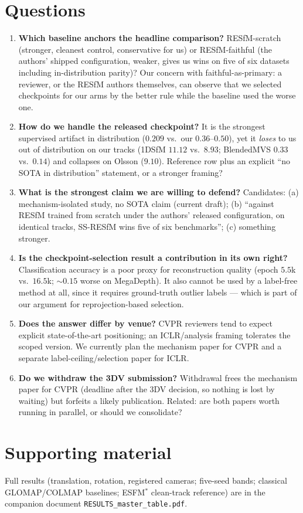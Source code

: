 \documentclass[11pt,letterpaper]{article}
\begin{document}
\section*{Questions}
\begin{enumerate}[leftmargin=*,itemsep=6pt]
\item \textbf{Which baseline anchors the headline comparison?} RESfM-scratch (stronger, cleanest
control, conservative for us) or RESfM-faithful (the authors' shipped configuration, weaker, gives
us wins on five of six datasets including in-distribution parity)? Our concern with faithful-as-primary:
a reviewer, or the RESfM authors themselves, can observe that we selected checkpoints for our arms
by the better rule while the baseline used the worse one.

\item \textbf{How do we handle the released checkpoint?} It is the strongest supervised artifact
in distribution ($0.209$ vs.\ our $0.36$--$0.50$), yet it \emph{loses} to us out of distribution on
our tracks (1DSfM $11.12$ vs.\ $8.93$; BlendedMVS $0.33$ vs.\ $0.14$) and collapses on Olsson
($9.10$). Reference row plus an explicit ``no SOTA in distribution'' statement, or a stronger framing?

\item \textbf{What is the strongest claim we are willing to defend?} Candidates:
(a) mechanism-isolated study, no SOTA claim (current draft);
(b) ``against RESfM trained from scratch under the authors' released configuration, on identical
tracks, SS-RESfM wins five of six benchmarks'';
(c) something stronger.

\item \textbf{Is the checkpoint-selection result a contribution in its own right?} Classification
accuracy is a poor proxy for reconstruction quality (epoch $5.5$k vs.\ $16.5$k; ${\sim}0.15$ worse
on MegaDepth). It also cannot be used by a label-free method at all, since it requires
ground-truth outlier labels --- which is part of our argument for reprojection-based selection.

\item \textbf{Does the answer differ by venue?} CVPR reviewers tend to expect explicit
state-of-the-art positioning; an ICLR/analysis framing tolerates the scoped version. We currently
plan the mechanism paper for CVPR and a separate label-ceiling/selection paper for ICLR.

\item \textbf{Do we withdraw the 3DV submission?} Withdrawal frees the mechanism paper for CVPR
(deadline after the 3DV decision, so nothing is lost by waiting) but forfeits a likely publication.
Related: are both papers worth running in parallel, or should we consolidate?
\end{enumerate}

\section*{Supporting material}
Full results (translation, rotation, registered cameras; five-seed bands; classical GLOMAP/COLMAP
baselines; ESFM$^{\ast}$ clean-track reference) are in the companion document
\texttt{RESULTS\_master\_table.pdf}.
\end{document}
